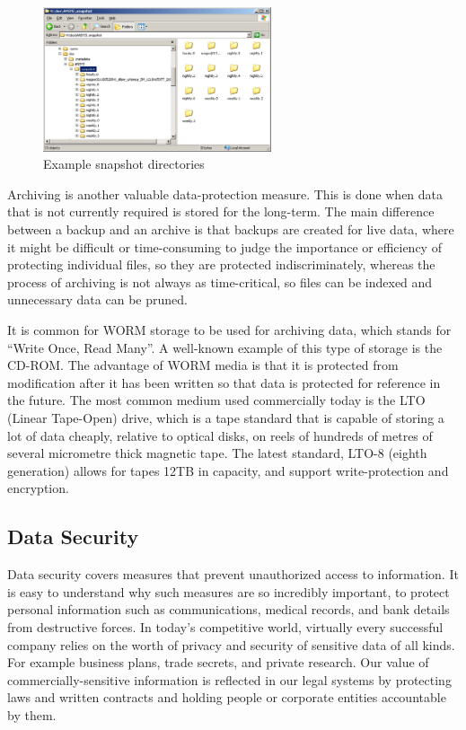 \begin{figure}
\includegraphics[width=0.6\textwidth,height=\textheight]{./images/snapshot_dirs.png}
\caption{Example snapshot directories}
\end{figure}

Archiving is another valuable data-protection measure. This is done when data that is not currently required is stored for the long-term. The main difference between a backup and an archive is that backups are created for live data, where it might be difficult or time-consuming to judge the importance or efficiency of protecting individual files, so they are protected indiscriminately, whereas the process of archiving is not always as time-critical, so files can be indexed and unnecessary data can be pruned.

It is common for WORM storage to be used for archiving data, which stands for ``Write Once, Read Many''. A well-known example of this type of storage is the CD-ROM. The advantage of WORM media is that it is protected from modification after it has been written so that data is protected for reference in the future. The most common medium used commercially today is the LTO (Linear Tape-Open) drive, which is a tape standard that is capable of storing a lot of data cheaply, relative to optical disks, on reels of hundreds of metres of several micrometre thick magnetic tape. The latest standard, LTO-8 (eighth generation) allows for tapes 12TB in capacity, and support write-protection and encryption.

\hypertarget{data-security}{%
\subsection{Data Security}\label{data-security}}

Data security covers measures that prevent unauthorized access to information. It is easy to understand why such measures are so incredibly important, to protect personal information such as communications, medical records, and bank details from destructive forces. In today's competitive world, virtually every successful company relies on the worth of privacy and security of sensitive data of all kinds. For example business plans, trade secrets, and private research. Our value of commercially-sensitive information is reflected in our legal systems by protecting laws and written contracts and holding people or corporate entities accountable by them.

